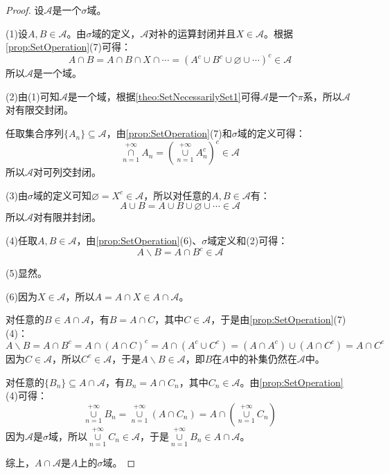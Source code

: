 \begin{proof}
	设$\mathscr{A}$是一个$\sigma$域。\par
	(1)设$A,B\in\mathscr{A}$。由$\sigma$域的定义，$\mathscr{A}$对补的运算封闭并且$X\in\mathscr{A}$。根据\cref{prop:SetOperation}(7)可得：
	\begin{equation*}
		A\cap B=A\cap B\cap X\cap\cdots=(A^c\cup B^c\cup\varnothing\cup\cdots)^c\in\mathscr{A}
	\end{equation*}
	所以$\mathscr{A}$是一个域。\par
	(2)由(1)可知$\mathscr{A}$是一个域，根据\cref{theo:SetNecessarilySet1}可得$\mathscr{A}$是一个$\pi$系，所以$\mathscr{A}$对有限交封闭。\par
	任取集合序列$\{A_n\}\subseteq\mathscr{A}$，由\cref{prop:SetOperation}(7)和$\sigma$域的定义可得：
	\begin{equation*}
		\underset{n=1}{\overset{+\infty}{\cap}}A_n=\left(\underset{n=1}{\overset{+\infty}{\cup}}A_n^c\right)^c\in\mathscr{A}
	\end{equation*}
	所以$\mathscr{A}$对可列交封闭。\par
	(3)由$\sigma$域的定义可知$\varnothing=X^c\in\mathscr{A}$，所以对任意的$A,B\in\mathscr{A}$有：
	\begin{equation*}
		A\cup B=A\cup B\cup\varnothing\cup\cdots\in\mathscr{A}
	\end{equation*}
	所以$\mathscr{A}$对有限并封闭。\par
	(4)任取$A,B\in\mathscr{A}$，由\cref{prop:SetOperation}(6)、$\sigma$域定义和(2)可得：
	\begin{equation*}
		A\backslash B=A\cap B^c\in\mathscr{A}
	\end{equation*}\par
	(5)显然。\par
	(6)因为$X\in\mathscr{A}$，所以$A=A\cap X\in A\cap\mathscr{A}$。\par
	对任意的$B\in A\cap\mathscr{A}$，有$B=A\cap C$，其中$C\in\mathscr{A}$，于是由\cref{prop:SetOperation}(7)(4)：
	\begin{equation*}
		A\backslash B=A\cap B^c=A\cap(A\cap C)^c=A\cap(A^c\cup C^c)=(A\cap A^c)\cup(A\cap C^c)=A\cap C^c
	\end{equation*}
	因为$C\in\mathscr{A}$，所以$C^c\in\mathscr{A}$，于是$A\backslash B\in\mathscr{A}$，即$B$在$A$中的补集仍然在$\mathscr{A}$中。\par
	对任意的$\{B_n\}\subseteq A\cap\mathscr{A}$，有$B_n=A\cap C_n$，其中$C_n\in\mathscr{A}$。由\cref{prop:SetOperation}(4)可得：
	\begin{equation*}
		\underset{n=1}{\overset{+\infty}{\cup}}B_n=\underset{n=1}{\overset{+\infty}{\cup}}(A\cap C_n)=A\cap\left(\underset{n=1}{\overset{+\infty}{\cup}}C_n\right)
	\end{equation*}
	因为$\mathscr{A}$是$\sigma$域，所以$\underset{n=1}{\overset{+\infty}{\cup}}C_n\in\mathscr{A}$，于是$\underset{n=1}{\overset{+\infty}{\cup}}B_n\in A\cap\mathscr{A}$。\par
	综上，$A\cap\mathscr{A}$是$A$上的$\sigma$域。
\end{proof}

